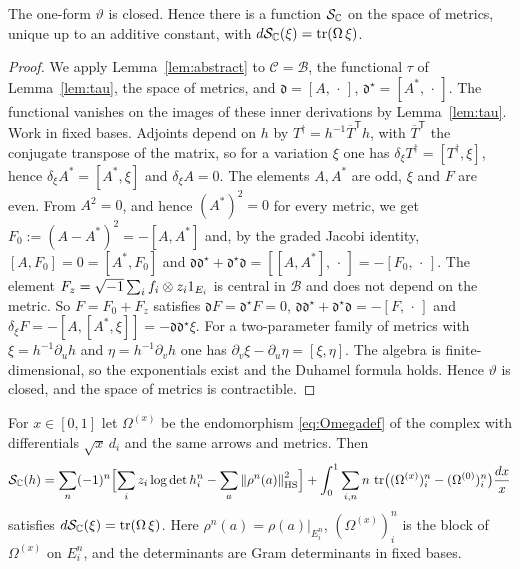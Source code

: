 \begin{theorem}[Closedness]\label{thm:closed}
The one-form $\vartheta$ is closed. Hence there is a function $\mathcal S_{\mathbb C}$ on the
space of metrics, unique up to an additive constant, with
$d\mathcal S_{\mathbb C}(\xi)=\operatorname{tr}(\Omega\,\xi)$.
\end{theorem}

\begin{proof}
We apply Lemma~\ref{lem:abstract} to $\mathcal C=\mathcal B$, the functional
$\tau$ of Lemma~\ref{lem:tau}, the space of metrics, and
$\mathfrak d=[A,\,\cdot\,]$, $\mathfrak d^\star=[A^*,\,\cdot\,]$. The
functional vanishes on the images of these inner derivations by
Lemma~\ref{lem:tau}. Work in fixed bases. Adjoints depend on $h$ by
$T^\dagger=h^{-1}\overline T^{\mathsf T}h$, with $\overline T^{\mathsf T}$ the
conjugate transpose of the matrix, so for a variation $\xi$ one has
$\delta_\xi T^\dagger=[T^\dagger,\xi]$, hence $\delta_\xi A^*=[A^*,\xi]$ and
$\delta_\xi A=0$. The elements $A,A^*$ are odd, $\xi$ and $F$ are even. From
$A^2=0$, and hence $(A^*)^2=0$ for every metric, we get
$F_0:=(A-A^*)^2=-[A,A^*]$ and, by the graded Jacobi identity,
$[A,F_0]=0=[A^*,F_0]$ and
$\mathfrak d\mathfrak d^\star+\mathfrak d^\star\mathfrak d=[[A,A^*],\,\cdot\,]=-[F_0,\,\cdot\,]$.
The element $F_z=\sqrt{-1}\sum_if_i\otimes z_i1_{E_i}$ is central in
$\mathcal B$ and does not depend on the metric. So $F=F_0+F_z$ satisfies
$\mathfrak dF=\mathfrak d^\star F=0$,
$\mathfrak d\mathfrak d^\star+\mathfrak d^\star\mathfrak d=-[F,\,\cdot\,]$ and
$\delta_\xi F=-[A,[A^*,\xi]]=-\mathfrak d\mathfrak d^\star\xi$. For a
two-parameter family of metrics with $\xi=h^{-1}\partial_uh$ and
$\eta=h^{-1}\partial_vh$ one has $\partial_v\xi-\partial_u\eta=[\xi,\eta]$.
The algebra is finite-dimensional, so the exponentials exist and the Duhamel
formula holds. Hence $\vartheta$ is closed, and the space of metrics is
contractible.
\end{proof}

\begin{theorem}[Primitive]\label{thm:primitive}
For $x\in[0,1]$ let $\Omega^{(x)}$ be the endomorphism \eqref{eq:Omegadef} of
the complex with differentials $\sqrt x\,d_i$ and the same arrows and metrics. Then
\[
 \mathcal S_{\mathbb C}(h)=\sum_n(-1)^n\Bigl[\sum_iz_i\log\det h_i^n-\sum_a\left\lVert\rho^n(a)\right\rVert^2_{\mathrm{HS}}\Bigr]
 +\int_0^1\sum_{i,n}n\,\operatorname{tr}\bigl((\Omega^{(x)})_i^n-(\Omega^{(0)})_i^n\bigr)\frac{dx}x
\]
satisfies $d\mathcal S_{\mathbb C}(\xi)=\operatorname{tr}(\Omega\,\xi)$. Here $\rho^n(a)=\rho(a)|_{E_i^n}$,
$(\Omega^{(x)})_i^n$ is the block of $\Omega^{(x)}$ on $E_i^n$, and the
determinants are Gram determinants in fixed bases.
\end{theorem}

